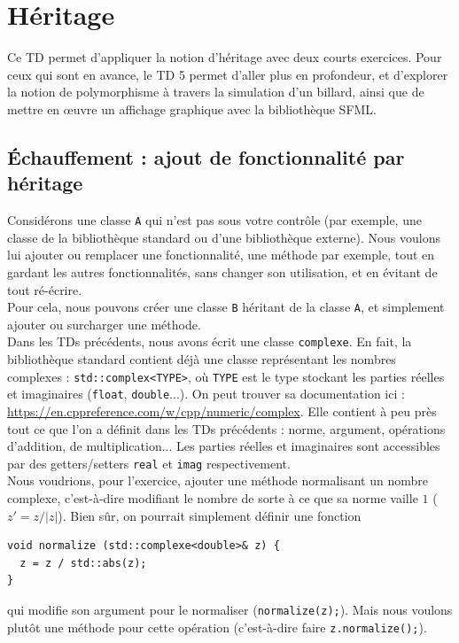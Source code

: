 \documentclass{book}
\newcommand{\inline}[1]{\texttt{#1}}
\begin{document}
\setcounter{chapter}{3}

\chapter{Héritage}

Ce TD permet d'appliquer la notion d'héritage avec deux courts exercices. Pour ceux qui sont en avance, le TD 5 permet d'aller plus en profondeur, et d'explorer la notion de polymorphisme à travers la simulation d'un billard, ainsi que de mettre en \oe uvre un affichage graphique avec la bibliothèque SFML.

\section{Échauffement : ajout de fonctionnalité par héritage}

Considérons une classe \inline{A} qui n'est pas sous votre contrôle (par exemple, une classe de la bibliothèque standard ou d'une bibliothèque externe). Nous voulons lui ajouter ou remplacer une fonctionnalité, une méthode par exemple, tout en gardant les autres fonctionnalités, sans changer son utilisation, et en évitant de tout ré-écrire.\\

Pour cela, nous pouvons créer une classe \inline{B} héritant de la classe \inline{A}, et simplement ajouter ou surcharger une méthode.\\

Dans les TDs précédents, nous avons écrit une classe \inline{complexe}. En fait, la bibliothèque standard contient déjà une classe représentant les nombres complexes : \inline{std::complex<TYPE>}, où \inline{TYPE} est le type stockant les parties réelles et imaginaires (\inline{float}, \inline{double}...). On peut trouver sa documentation ici : \url{https://en.cppreference.com/w/cpp/numeric/complex}. Elle contient à peu près tout ce que l'on a définit dans les TDs précédents : norme, argument, opérations d'addition, de multiplication... Les parties réelles et imaginaires sont accessibles par des getters/setters \inline{real} et \inline{imag} respectivement.\\

Nous voudrions, pour l'exercice, ajouter une méthode normalisant un nombre complexe, c'est-à-dire modifiant le nombre de sorte à ce que sa norme vaille $1$ ($z'=z/|z|$). Bien sûr, on pourrait simplement définir une fonction
\begin{verbatim}
void normalize (std::complexe<double>& z) {
  z = z / std::abs(z);
}
\end{verbatim}
qui modifie son argument pour le normaliser (\inline{normalize(z);}). Mais nous voulons plutôt une méthode pour cette opération (c'est-à-dire faire \inline{z.normalize();}).\\
\end{document}
